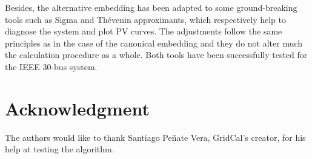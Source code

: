 \documentclass[conference]{IEEEtran}
\begin{document}
Besides, the alternative embedding has been adapted to some ground-breaking tools such as Sigma and Thévenin approximants, which respectively help to diagnose the system and plot PV curves. The adjustments follow the same principles as in the case of the canonical embedding and they do not alter much the calculation procedure as a whole. Both tools have been successfully tested for the IEEE 30-bus system.






\section*{Acknowledgment}
The authors would like to thank Santiago Peñate Vera, GridCal's creator, for his help at testing the algorithm.







%
%
%

% 
\end{document}
